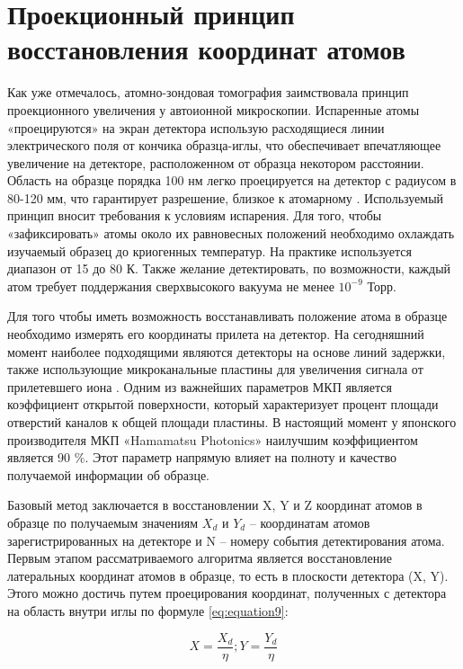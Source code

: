 \FloatBarrier

\section{Проекционный принцип восстановления координат атомов}\label{sec:ch1/sec3}

Как уже отмечалось, атомно-зондовая томография заимствовала принцип проекционного увеличения у автоионной микроскопии. Испаренные атомы «проецируются» на экран детектора использую расходящиеся линии электрического поля от кончика образца-иглы, что обеспечивает впечатляющее увеличение на детекторе, расположенном от образца некотором расстоянии. Область на образце порядка 100 нм легко проецируется на детектор с радиусом в 80-120 мм, что гарантирует разрешение, близкое к атомарному \cite{Cadel09}. Используемый принцип вносит требования к условиям испарения. Для того, чтобы «зафиксировать» атомы около их равновесных положений необходимо охлаждать изучаемый образец до криогенных температур. На практике используется диапазон от 15 до 80 К. Также желание детектировать, по возможности, каждый атом требует поддержания сверхвысокого вакуума не менее $10^{-9}$ Торр.

Для того чтобы иметь возможность восстанавливать положение атома в образце необходимо измерять его координаты прилета на детектор. На сегодняшний момент наиболее подходящими являются детекторы на основе линий задержки, также использующие микроканальные пластины для увеличения сигнала от прилетевшего иона \cite{DaCosta05,Jagutzki05}. Одним из важнейших параметров МКП является коэффициент открытой поверхности, который характеризует процент площади отверстий каналов к общей площади пластины. В настоящий момент у японского производителя МКП «Hamamatsu Photonics» \cite{Hamamatsu} наилучшим коэффициентом является 90 $\%$. Этот параметр напрямую влияет на полноту и качество получаемой информации об образце.

Базовый метод заключается в восстановлении X, Y и Z координат атомов в образце по получаемым значениям $X_d$ и $Y_d$ – координатам атомов зарегистрированных на детекторе и N – номеру события детектирования атома. Первым этапом рассматриваемого алгоритма является восстановление латеральных координат атомов в образце, то есть в плоскости детектора (X, Y). Этого можно достичь путем проецирования координат, полученных с детектора на область внутри иглы по формуле \cref{eq:equation9}:

\begin{equation}
	\label{eq:equation9}
	X = \frac{X_d}{\eta}; Y = \frac{Y_d}{\eta}
\end{equation} 

